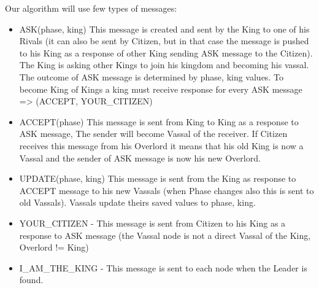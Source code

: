 \documentclass{article}
\begin{document}
Our algorithm will use few types of messages:
\begin{itemize}
    \item ASK(phase, king)
    This message is created and sent by the King to one of his Rivals (it can also be sent by Citizen, but in that case the message is pushed to his King as a response of other King sending ASK message to the Citizen). The King is asking other Kings to join his kingdom and becoming his vassal. The outcome of ASK message is determined by phase, king values. To become King of Kings a king must receive response for every ASK message => (ACCEPT, YOUR\_CITIZEN)
    \item ACCEPT(phase)
    This message is sent from King to King as a response to ASK message, The sender will become Vassal of the receiver. If Citizen receives this message from his Overlord it means that his old King is now a Vassal and the sender of ASK message is now his new Overlord.
    \item UPDATE(phase, king)
    This message is sent from the King as response to ACCEPT message to his new Vassals (when Phase changes also this is sent to old Vassals). Vassals update theirs saved values to phase, king.
    \item YOUR\_CITIZEN - This message is sent from Citizen to his King as a response to ASK message (the Vassal node is not a direct Vassal of the King, Overlord != King)
    \item I\_AM\_THE\_KING - This message is sent to each node when the Leader is found.
\end{itemize}
\end{document}
